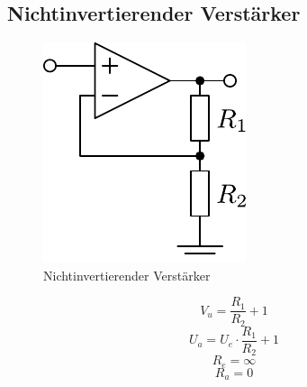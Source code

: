 



\subsection{Nichtinvertierender Verstärker}
\begin{figure}[h!]
	\centering
	\includegraphics[scale=\schscale]{op_ninv.pdf}
	\caption{Nichtinvertierender Verstärker}
	\label{sch:op-ninv}
\end{figure}
\[ V_u = \frac{R_1}{R_2} + 1 \]
\[ U_a = U_e \cdot \frac{R_1}{R_2} + 1 \]
\[ R_e = \infty \]
\[ R_a = 0 \]